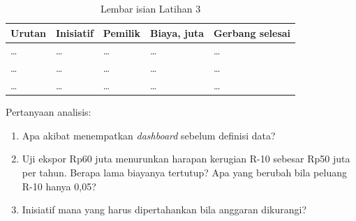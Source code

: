 \begin{table}[!htb]
  \centering\small
  \caption{Lembar isian Latihan 3}\label{tab:ch14-lat3-hasil}
  \begin{tabularx}{\textwidth}{|>{\raggedright\arraybackslash}p{}|>{\raggedright\arraybackslash}X|>{\raggedright\arraybackslash}X|>{\raggedright\arraybackslash}p{}|>{\raggedright\arraybackslash}X|}
    \hline
    \textbf{Urutan} & \textbf{Inisiatif} & \textbf{Pemilik} & \textbf{Biaya, juta} & \textbf{Gerbang
    selesai} \\ \hline
    \dots & \dots & \dots & \dots & \dots \\ \hline
    \dots & \dots & \dots & \dots & \dots \\ \hline
    \dots & \dots & \dots & \dots & \dots \\ \hline
  \end{tabularx}
\end{table}

Pertanyaan analisis:
\begin{enumerate}
  \item Apa akibat menempatkan \textit{dashboard} sebelum definisi data?
  \item Uji ekspor Rp60 juta menurunkan harapan kerugian R-10 sebesar Rp50 juta per tahun. Berapa
  lama biayanya tertutup? Apa yang berubah bila peluang R-10 hanya 0,05?
  \item Inisiatif mana yang harus dipertahankan bila anggaran dikurangi?
\end{enumerate}

